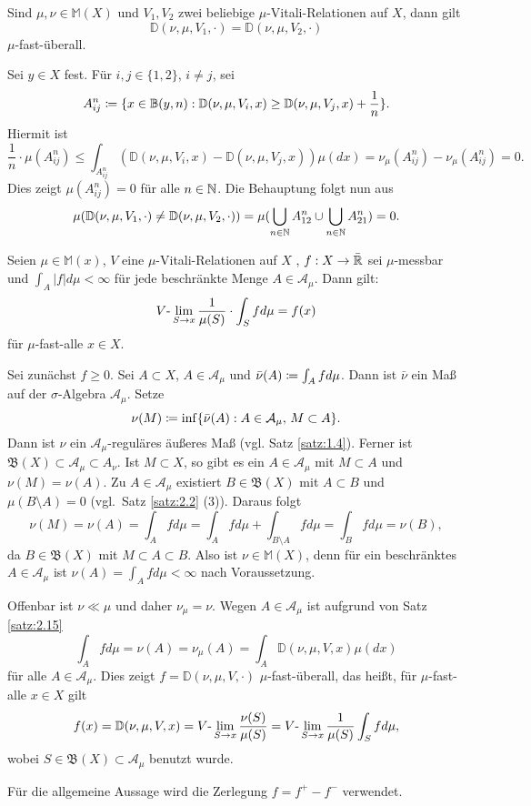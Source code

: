 \documentclass[a4paper,twoside,DIV15,BCOR12mm]{scrbook}
\newcommand{\A}{\mathcal A}
\newcommand{\borel}{\mathfrak B}
\begin{document}
\begin{satz}
\label{satz:2.16}
Sind $\mu,\nu\in\mathbb M(X)$ und $V_1,V_2$ zwei beliebige $\mu$-Vitali-Relationen auf $X$, dann gilt
\[
\mathbb D(\nu,\mu,V_1,\cdot) = \mathbb D(\nu,\mu,V_2,\cdot)
\]
$\mu$-fast-überall.
\end{satz}

\begin{beweis}
Sei $y\in X$ fest. Für $i,j\in\{1,2\}$, $i\ne j$, sei
\[
A_{ij}^n \da \{x\in \mathbb B(y,n): \mathbb D(\nu,\mu,V_i,x) \ge \mathbb D(\nu,\mu,V_j,x) + \frac1n\}.
\]
Hiermit ist
\[
\frac 1n\cdot \mu(A_{ij}^n) \le \int_{A_{ij}^n}(\mathbb D(\nu,\mu,V_i,x) - \mathbb D(\nu,\mu,V_j,x)) \mu(dx) = \nu_\mu(A_{ij}^n) - \nu_\mu(A_{ij}^n) = 0.
\]
Dies zeigt $\mu(A_{ij}^n)=0$ für alle $n\in\mathbb{N}$. Die Behauptung folgt nun aus 
\[
\mu(\mathbb D(\nu,\mu,V_1,\cdot) \ne \mathbb D(\nu,\mu,V_2,\cdot)) =  \mu(\bigcup_{n\in\mathbb{N}} A_{12}^n \cup \bigcup_{n\in\mathbb{N}} A_{21}^n) = 0.
\]
\end{beweis}

\begin{satz}
\label{satz:2.17}
Seien $\mu\in\mathbb M(x)$, $V$ eine $\mu$-Vitali-Relationen auf $X$ , $f:X\to\bar{\mathbb{R}}$ sei $\mu$-messbar und $\int_A |f|d\mu <\infty$ für jede beschränkte Menge $A\in\A_\mu$. Dann gilt:
\[
V\text-\lim_{S\to x} \frac1{\mu(S)} \cdot \int_S fd\mu = f(x)
\]
für $\mu$-fast-alle $x\in X$.
\end{satz}

\begin{beweis}
Sei zunächst $f\ge 0$. Sei $A\subset X$, $A\in \mathcal{A}_\mu$ und $\bar\nu(A) \da \int_A fd\mu$. Dann ist $\bar\nu$ ein Maß auf der $\sigma$-Algebra $\mathcal{A}_\mu$. Setze
\[
\nu(M) \da \inf\{\bar\nu(A):  A\in \A_\mu,\, M\subset A \}.
\]
Dann ist $\nu$ ein $\A_\mu$-reguläres äußeres Maß (vgl. Satz \ref{satz:1.4}). Ferner ist $\borel(X) \subset \A_\mu \subset A_\nu$. Ist $M\subset X$, so gibt es ein $A\in \A_\mu$ mit $M\subset A$ und $\nu(M)=\nu(A)$. Zu $A\in \A_\mu$ existiert $B\in\borel(X)$ mit $A\subset B$ und $\mu(B\setminus A)=0$ (vgl.\ Satz \ref{satz:2.2} (3)). Daraus folgt
\[
\nu(M) = \nu(A) = \int_Afd\mu = \int_A fd\mu + \int_{B\setminus A} fd\mu = \int_B fd\mu = \nu(B),
\]
da $B\in\borel(X)$ mit $M\subset A \subset B$. Also ist $\nu\in\mathbb M(X)$, denn für ein beschränktes $A\in\A_\mu$ ist $\nu(A) = \int_A fd\mu < \infty$ nach Voraussetzung.

Offenbar ist $\nu \ll \mu$ und daher $\nu_\mu = \nu$. Wegen $A\in\A_\mu$ ist aufgrund von Satz \ref{satz:2.15}
\[
\int_A fd\mu = \nu(A) = \nu_\mu(A) = \int_A \mathbb D(\nu,\mu,V,x)\mu(dx)
\]
für alle $A\in\A_\mu$. Dies zeigt $f = \mathbb D(\nu,\mu,V,\cdot)$ $\mu$-fast-überall, das heißt, für $\mu$-fast-alle $x\in X$ gilt
\[
f(x) = \mathbb D(\nu,\mu,V,x) = V\text-\lim_{S\to x} \frac{\nu(S)}{\mu(S)} =  V\text-\lim_{S\to x} \frac1{\mu(S)} \int_S fd\mu,
\]
wobei $S\in\borel(X)\subset\mathcal{A}_\mu$ benutzt wurde.

Für die allgemeine Aussage wird die Zerlegung $f=f^+-f^-$ verwendet.
\end{beweis}
\end{document}

